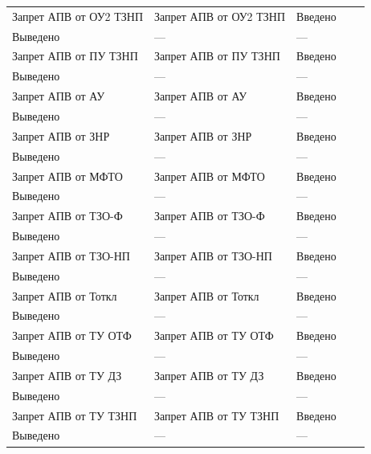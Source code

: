 \begin{longtable}{|>{\centering\arraybackslash}m{5.3cm}|>{\centering\arraybackslash}m{3.3cm}|>{\centering\arraybackslash}m{4.2cm}|>{\centering\arraybackslash}m{1.8cm}|>{\centering\arraybackslash}m{1cm}|}
\hline
\raggedright Запрет АПВ от ОУ2 ТЗНП & \centering Запрет АПВ от ОУ2 ТЗНП & \centering Введено \\ Выведено & \centering --- & \centering \arraybackslash --- \\
\hline
\raggedright Запрет АПВ от ПУ ТЗНП & \centering Запрет АПВ от ПУ ТЗНП & \centering Введено \\ Выведено & \centering --- & \centering \arraybackslash --- \\
\hline
\raggedright Запрет АПВ от АУ & \centering Запрет АПВ от АУ & \centering Введено \\ Выведено & \centering --- & \centering \arraybackslash --- \\
\hline
\raggedright Запрет АПВ от ЗНР & \centering Запрет АПВ от ЗНР & \centering Введено \\ Выведено & \centering --- & \centering \arraybackslash --- \\
\hline
\raggedright Запрет АПВ от МФТО & \centering Запрет АПВ от МФТО & \centering Введено \\ Выведено & \centering --- & \centering \arraybackslash --- \\
\hline
\raggedright Запрет АПВ от ТЗО-Ф & \centering Запрет АПВ от ТЗО-Ф & \centering Введено \\ Выведено & \centering --- & \centering \arraybackslash --- \\
\hline
\raggedright Запрет АПВ от ТЗО-НП & \centering Запрет АПВ от ТЗО-НП & \centering Введено \\ Выведено & \centering --- & \centering \arraybackslash --- \\
\hline
\raggedright Запрет АПВ от Тоткл & \centering Запрет АПВ от Тоткл & \centering Введено \\ Выведено & \centering --- & \centering \arraybackslash --- \\
\hline
\raggedright Запрет АПВ от ТУ ОТФ & \centering Запрет АПВ от ТУ ОТФ & \centering Введено \\ Выведено & \centering --- & \centering \arraybackslash --- \\
\hline
\raggedright Запрет АПВ от ТУ ДЗ & \centering Запрет АПВ от ТУ ДЗ & \centering Введено \\ Выведено & \centering --- & \centering \arraybackslash --- \\
\hline
\raggedright Запрет АПВ от ТУ ТЗНП & \centering Запрет АПВ от ТУ ТЗНП & \centering Введено \\ Выведено & \centering --- & \centering \arraybackslash --- \\

\end{longtable}
